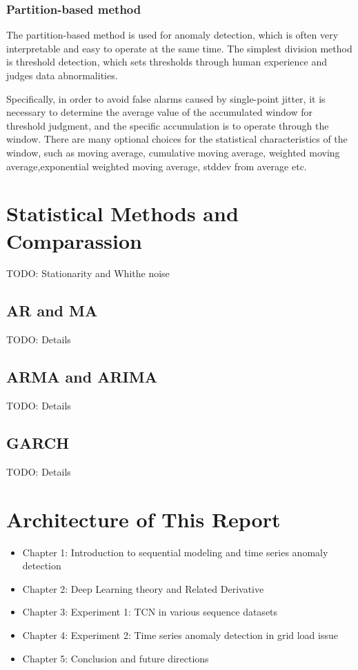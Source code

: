 \subsubsection{Partition-based method}
The partition-based method is used for anomaly detection, which is often very interpretable and easy to operate at the same time. The simplest division method is threshold detection, which sets thresholds through human experience and judges data abnormalities.

Specifically, in order to avoid false alarms caused by single-point jitter, it is necessary to determine the average value of the accumulated window for threshold judgment, and the specific accumulation is to operate through the window. There are many optional choices for the statistical characteristics of the window, such as moving average, cumulative moving average, weighted moving average,exponential weighted moving average, stddev from average etc. 

\section{Statistical Methods and Comparassion}
TODO: Stationarity and Whithe noise
\subsection{AR and MA}
TODO: Details
\subsection{ARMA and ARIMA}
TODO: Details
\subsection{GARCH}
TODO: Details


\section{Architecture of This Report}

\begin{itemize}
\item Chapter 1: Introduction to sequential modeling and time series anomaly detection
\item Chapter 2: Deep Learning theory and Related Derivative
\item Chapter 3: Experiment 1: TCN in various sequence datasets
\item Chapter 4: Experiment 2: Time series anomaly detection in grid load issue
\item Chapter 5: Conclusion and future directions
\end{itemize}
